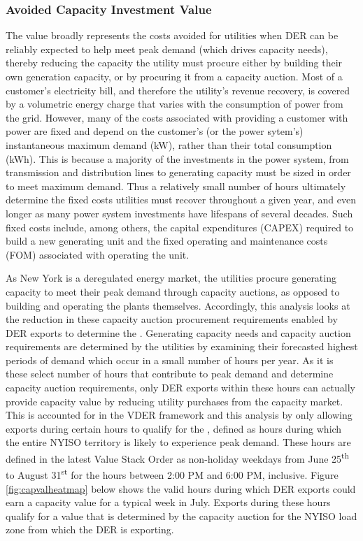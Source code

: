 
\subsubsection{Avoided Capacity Investment Value}
\label{meth_val_aciv}
The \aciv{} value broadly represents the costs avoided for utilities when DER can be reliably expected to help meet peak demand (which drives capacity needs), thereby reducing the capacity the utility must procure either by building their own generation capacity, or by procuring it from a capacity auction. Most of a customer’s electricity bill, and therefore the utility's revenue recovery, is covered by a volumetric energy charge that varies with the consumption of power from the grid. However, many of the costs associated with providing a customer with power are fixed and depend on the customer's (or the power sytem's) instantaneous maximum demand (kW), rather than their total consumption (kWh). This is because a majority of the investments in the power system, from transmission and distribution lines to generating capacity must be sized in order to meet maximum demand. Thus a relatively small number of hours ultimately determine the fixed costs utilities must recover throughout a given year, and even longer as many power system investments have lifespans of several decades. Such fixed costs include, among others, the capital expenditures (CAPEX) required to build a new generating unit and the fixed operating and maintenance costs (FOM) associated with operating the unit. 

As New York is a deregulated energy market, the utilities procure generating capacity to meet their peak demand through capacity auctions, as opposed to building and operating the plants themselves. Accordingly, this analysis looks at the reduction in these capacity auction procurement requirements enabled by DER exports to determine the \aciv{}. Generating capacity needs and capacity auction requirements are determined by the utilities by examining their forecasted highest periods of demand which occur in a small number of hours per year. As it is these select number of hours that contribute to peak demand and determine capacity auction requirements, only DER exports within these hours can actually provide capacity value by reducing utility purchases from the capacity market. This  is accounted for in the VDER framework and this analysis by only allowing exports during certain hours to qualify for the \aciv{}, defined as hours during which the entire NYISO territory is likely to experience peak demand. These hours are defined in the latest Value Stack Order as non-holiday weekdays from June 25\textsuperscript{th} to August 31\textsuperscript{st} for the hours between 2:00 PM and 6:00 PM, inclusive. Figure \ref{fig:capvalheatmap} below shows the valid hours during which DER exports could earn a capacity value for a typical week in July. Exports during these hours qualify for a value that is determined by the capacity auction for the NYISO load zone from which the DER is exporting.

